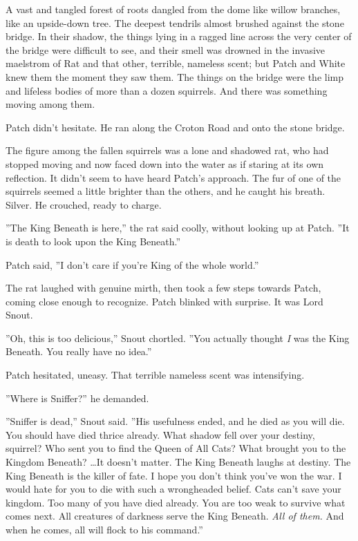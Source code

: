 \documentclass[12pt]{book}
\begin{document}
A vast and tangled forest of roots dangled from the dome like willow
branches, like an upside-down tree. The deepest tendrils almost
brushed against the stone bridge. In their shadow, the things lying in
a ragged line across the very center of the bridge were difficult to
see, and their smell was drowned in the invasive maelstrom of Rat and
that other, terrible, nameless scent; but Patch and White knew them
the moment they saw them. The things on the bridge were the limp and
lifeless bodies of more than a dozen squirrels. And there was
something moving among them.

Patch didn't hesitate. He ran along the Croton Road and onto the stone
bridge.

The figure among the fallen squirrels was a lone and shadowed rat, who
had stopped moving and now faced down into the water as if staring at
its own reflection. It didn't seem to have heard Patch's approach. The
fur of one of the squirrels seemed a little brighter than the others,
and he caught his breath. Silver. He crouched, ready to charge.

''The King Beneath is here,'' the rat said coolly, without looking up
at Patch. ''It is death to look upon the King Beneath.''

Patch said, ''I don't care if you're King of the whole world.''

The rat laughed with genuine mirth, then took a few steps towards
Patch, coming close enough to recognize. Patch blinked with
surprise. It was Lord Snout.

''Oh, this is too delicious,'' Snout chortled. ''You actually thought
\textit{I} was the King Beneath. You really have no idea.''

Patch hesitated, uneasy. That terrible nameless scent was
intensifying.

''Where is Sniffer?'' he demanded.

''Sniffer is dead,'' Snout said. ''His usefulness ended, and he died
as you will die. You should have died thrice already. What shadow fell
over your destiny, squirrel? Who sent you to find the Queen of All
Cats? What brought you to the Kingdom Beneath? \ldots{}It doesn't
matter. The King Beneath laughs at destiny. The King Beneath is the
killer of fate. I hope you don't think you've won the war. I would
hate for you to die with such a wrongheaded belief. Cats can't save
your kingdom. Too many of you have died already. You are too weak to
survive what comes next. All creatures of darkness serve the King
Beneath. \textit{All of them.} And when he comes, all will flock to
his command.''
\end{document}
